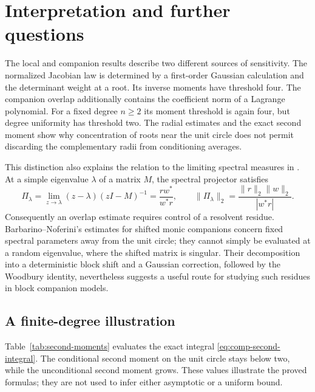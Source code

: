 \section{Interpretation and further questions}\label{sec:discussion}

The local and companion results describe two different sources of sensitivity.
The normalized Jacobian law is determined by a first-order Gaussian calculation
and the determinant weight at a root. Its inverse moments have threshold four.
The companion overlap additionally contains the coefficient norm of a Lagrange
polynomial. For a fixed degree $n\ge2$ its moment threshold is again four, but degree
uniformity has threshold two. The radial estimates and the exact second moment
show why concentration of roots near the unit circle does not permit discarding
the complementary radii from conditioning averages.

This distinction also explains the relation to the limiting spectral measures
in \cite{barbarino2023monic,barbarino2022limit}. At a simple eigenvalue $\lambda$
of a matrix $M$, the spectral projector satisfies
\[
 \Pi_\lambda=\lim_{z\to\lambda}(z-\lambda)(zI-M)^{-1}
 =\frac{rw^*}{w^*r},\qquad \|\Pi_\lambda\|_2
 =\frac{\|r\|_2\|w\|_2}{|w^*r|}.
\]
Consequently an overlap estimate requires control of a resolvent residue.
Barbarino--Noferini's estimates for shifted monic companions
\cite[Lemma~A.11]{barbarino2023monic} concern fixed spectral parameters away
from the unit circle; they cannot simply be evaluated at a random eigenvalue,
where the shifted matrix is singular. Their decomposition into a deterministic
block shift and a Gaussian correction, followed by the Woodbury identity,
nevertheless suggests a useful route for studying such residues in block
companion models.

\subsection{A finite-degree illustration}

Table~\ref{tab:second-moments} evaluates the exact integral
\eqref{eq:comp-second-integral}. The conditional second moment on the unit
circle stays below two, while the unconditional second moment grows. These
values illustrate the proved formulas; they are not used to infer either
asymptotic or a uniform bound.

\begin{table}[htbp]
\centering

\caption{Deterministic quadrature of the exact second-moment formula.
Positive-coefficient Horner evaluation avoids cancellation at $r=1$.
Computations at 30 and 50 decimal digits agreed to more than 25 decimal places;
the table reports six. Degrees one and two also agree with their exact values
in Example~\ref{ex:comp-small}.}
\label{tab:second-moments}
\end{table}

